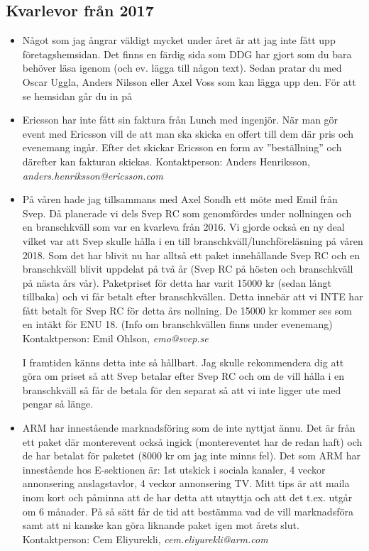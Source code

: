 \documentclass[10pt]{article}
\begin{document}
\subsection*{Kvarlevor från 2017}
\begin{itemize}
\item Något som jag ångrar väldigt mycket under året är att jag inte fått upp företagshemsidan. Det finns en färdig sida som DDG har gjort som du bara behöver läsa igenom (och ev. lägga till någon text). Sedan pratar du med Oscar Uggla, Anders Nilsson eller Axel Voss som kan lägga upp den. För att se hemsidan går du in på %

\item Ericsson har inte fått sin faktura från Lunch med ingenjör. När man gör event med Ericsson vill de att man ska skicka en offert till dem där pris och evenemang ingår. Efter det skickar Ericsson en form av ''beställning'' och därefter kan fakturan skickas. Kontaktperson: Anders Henriksson, \textit{anders.henriksson@ericsson.com}

\item På våren hade jag tillsammans med Axel Sondh ett möte med Emil från Svep. Då planerade vi dels Svep RC som genomfördes under nollningen och en branschkväll som var en kvarleva från 2016. Vi gjorde också en ny deal vilket var att Svep skulle hålla i en till branschkväll/lunchföreläsning på våren 2018. Som det har blivit nu har alltså ett paket innehållande Svep RC och en branschkväll blivit uppdelat på två år (Svep RC på hösten och branschkväll på nästa års vår). Paketpriset för detta har varit 15000 kr (sedan långt tillbaka) och vi får betalt efter branschkvällen. Detta innebär att vi INTE har fått betalt för Svep RC för detta års nollning. De 15000 kr kommer ses som en intäkt för ENU 18. (Info om branschkvällen finns under evenemang) Kontaktperson: Emil Ohlson, \textit{emo@svep.se}

I framtiden känns detta inte så hållbart. Jag skulle rekommendera dig att göra om priset så att Svep betalar efter Svep RC och om de vill hålla i en branschkväll så får de betala för den separat så att vi inte ligger ute med pengar så länge.

\item ARM har innestående marknadsföring som de inte nyttjat ännu. Det är från ett paket där monterevent också ingick (montereventet har de redan haft) och de har betalat för paketet (8000 kr om jag inte minns fel). Det som ARM har innestående hos E-sektionen är: 1st utskick i sociala kanaler, 4 veckor annonsering anslagstavlor, 4
veckor annonsering TV. Mitt tips är att maila inom kort och påminna att de har detta att utnyttja och
att det t.ex. utgår om 6 månader. På så sätt får de tid att bestämma vad de vill marknadsföra samt att
ni kanske kan göra liknande paket igen mot årets slut. Kontaktperson: Cem Eliyurekli, \textit{cem.eliyurekli@arm.com}


\end{itemize}
\end{document}
